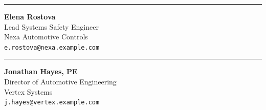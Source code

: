 \vspace{1.5cm}
\noindent
\begin{minipage}{0.48\textwidth}
    \hrule
    \vspace{0.5em}
    \textbf{Elena Rostova} \\
    Lead Systems Safety Engineer \\
    Nexa Automotive Controls \\
    \texttt{e.rostova@nexa.example.com}
\end{minipage}
\hfill
\begin{minipage}{0.48\textwidth}
    \hrule
    \vspace{0.5em}
    \textbf{Jonathan Hayes, PE} \\
    Director of Automotive Engineering \\
    Vertex Systems \\
    \texttt{j.hayes@vertex.example.com}
\end{minipage}
